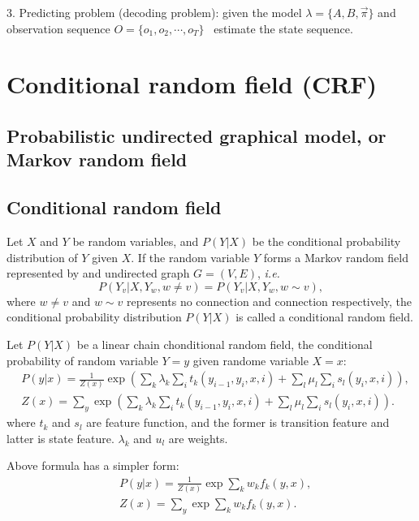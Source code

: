 \documentclass[10pt,onecolumn]{book}
\def\ie{\emph{i.e.}}
\begin{document}
3. Predicting problem (decoding problem): given the model $\lambda = \{A, B, \vec{\pi}\}$ and observation sequence $O = \{o_1, o_2, \cdots, o_T\}$ \, estimate the state sequence. 

\section{Conditional random field (CRF)}
\subsection{Probabilistic undirected graphical model, or Markov random field}
\subsection{Conditional random field}
Let $X$ and $Y$ be random variables, and $P(Y|X)$ be the conditional probability distribution of $Y$ given $X$. If the random variable $Y$ forms a Markov random field represented by and undirected graph $G=(V, E)$, \ie
\begin{equation}
P(Y_v | X, Y_w, w \neq v) = P(Y_v | X, Y_w, w \sim v),
\end{equation}
where $w \neq v$ and $w \sim v$ represents no connection and connection respectively, the conditional probability distribution $P(Y|X)$ is called a conditional random field.

Let $P(Y|X)$ be a linear chain chonditional random field, the conditional probability of random variable $Y = y$ given randome variable $X = x$:
\begin{equation}
\begin{split}
& P(y|x) = \frac{1}{Z(x)} \exp \left( \sum_k \lambda_k \sum_i t_k(y_{i-1}, y_i, x, i) + \sum_l \mu_l \sum_i s_l(y_i, x, i) \right), \\
& Z(x) = \sum_y \exp\left( \sum_k \lambda_k \sum_i t_k(y_{i-1}, y_i, x, i) + \sum_l \mu_l \sum_i s_l(y_i, x, i) \right).
\end{split}
\end{equation}
where $t_k$ and $s_l$ are feature function, and the former is transition feature and latter is state feature. $\lambda_k$ and $u_l$ are weights.

Above formula has a simpler form:
\begin{equation}
\begin{split}
& P(y|x) = \frac{1}{Z(x)} \exp \sum_{k} w_k f_k(y, x), \\
& Z(x) = \sum_y \exp \sum_{k} w_k f_k(y, x).
\end{split}
\end{equation}
\end{document}
